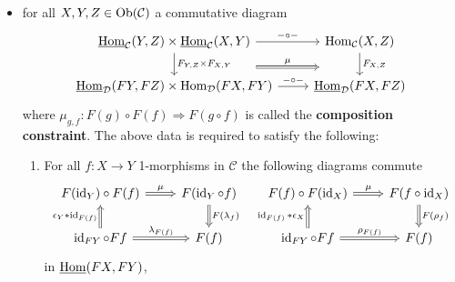 \begin{defi}
\begin{itemize}
		\item 
		for all $ X , Y , Z \in \operatorname{Ob} ( \mathcal{ C } ) $ a commutative diagram
		\[
		\begin{tikzcd}
			\underline{ \Hom }_{ \mathcal{ C } } ( Y , Z ) \times 
			\underline{ \Hom }_{ \mathcal{ C } } ( X , Y )
			\ar[r, " - \circ - " ]
			\ar[r, shift right=2em, Rightarrow, " \mu "]
			\ar[d, " F_{ Y , Z } \times F_{ X , Y } "]
			&
			\Hom_{ \mathcal{ C } } ( X , Z )
			\ar[d, " F_{ X , Z }"]
			\\
			\underline{ \Hom }_{\mathcal{ D } }( F Y , F Z ) \times 
			\Hom_{ \mathcal{ D } } ( F X , F Y )
			\ar[r, " - \circ - "]
			&
			\underline{ \Hom }_{ \mathcal{ D } } ( F X , F Z )
		\end{tikzcd}
		\] 
		where $ \mu_{ g , f } \colon F ( g ) \circ F ( f ) \Rightarrow F ( g \circ f ) $ is called the \textbf{composition constraint}.
		The above data is required to satisfy the following:
		\begin{enumerate}[label=(\alph*)]
			\item 
				For all $ f \colon X \to Y $ 1-morphisms in $ \mathcal{ C } $ the following diagrams commute
				\[
				\begin{tikzcd}
					F ( \id_Y ) \circ F ( f ) 
					\ar[r, Rightarrow, "\mu"]
					&
					F ( \id_Y \circ f ) 
					\ar[d, Rightarrow, " F ( \lambda_f )"]
					\\
					\id_{FY} \circ Ff
					\ar[u, Rightarrow, "\epsilon_Y * \id_{ F ( f ) }" ]
					\ar[r , Rightarrow , "\lambda_{ F ( f ) }"]
					&
					F ( f ) 
				\end{tikzcd}	
				\quad
				\begin{tikzcd}
					F ( f ) \circ F ( \id_X ) 
					\ar[r, Rightarrow, "\mu"]
					&
					F ( f \circ \id_X ) 
					\ar[d, Rightarrow, " F ( \rho _f )"]
					\\
					\id_{ F Y } \circ Ff
					\ar[u, Rightarrow, " \id_{ F ( f ) } * \epsilon_X " ]
					\ar[r , Rightarrow , "\rho_{ F ( f ) }"]
					&
					F ( f ) 
				\end{tikzcd}	
				\]
				in $\underline{\operatorname{Hom}} ( FX , FY ) $,
				

\end{enumerate}
\end{itemize}
\end{defi}

